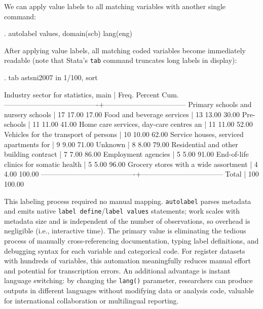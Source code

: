 We can apply value labels to all matching variables with another single command:

\begin{stlog}
. autolabel values, domain(scb) lang(eng)
\end{stlog}

After applying value labels, all matching coded variables become immediately readable (note that Stata's \texttt{tab} command truncates long labels in display):
\begin{stlog}
. tab astsni2007 in 1/100, sort

   Industry sector for statistics, main |      Freq.     Percent        Cum.
----------------------------------------+-----------------------------------
    Primary schools and nursery schools |         17       17.00       17.00
             Food and beverage services |         13       13.00       30.00
                            Pre-schools |         11       11.00       41.00
Home care services, day-care centres an |         11       11.00       52.00
  Vehicles for the transport of persons |         10       10.00       62.00
Service houses, serviced apartments for |          9        9.00       71.00
                                Unknown |          8        8.00       79.00
Residential and other building contract |          7        7.00       86.00
                    Employment agencies |          5        5.00       91.00
End-of-life clinics for somatic health  |          5        5.00       96.00
  Grocery stores with a wide assortment |          4        4.00      100.00
----------------------------------------+-----------------------------------
                                  Total |        100      100.00
\end{stlog}

\vspace{0.5em}
\noindent This labeling process required no manual mapping. \texttt{autolabel} parses metadata and emits native \texttt{label define}/\texttt{label values} statements; work scales with metadata size and is independent of the number of observations, so overhead is negligible (i.e., interactive time). The primary value is eliminating the tedious process of manually cross-referencing documentation, typing label definitions, and debugging syntax for each variable and categorical code. For register datasets with hundreds of variables, this automation meaningfully reduces manual effort and potential for transcription errors. An additional advantage is instant language switching: by changing the \texttt{lang()} parameter, researchers can produce outputs in different languages without modifying data or analysis code, valuable for international collaboration or multilingual reporting.

